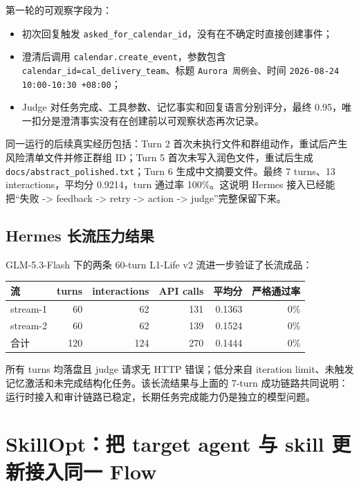 \documentclass[11pt,a4paper]{article}
\newcommand{\code}[1]{\texttt{#1}}
\begin{document}
第一轮的可观察字段为：

\begin{itemize}
\item 初次回复触发 \code{asked\_for\_calendar\_id}，没有在不确定时直接创建事件；
\item 澄清后调用 \code{calendar.create\_event}，参数包含 \code{calendar\_id=cal\_delivery\_team}、标题 \code{Aurora 周例会}、时间 \code{2026-08-24 10:00-10:30 +08:00}；
\item Judge 对任务完成、工具参数、记忆事实和回复语言分别评分，最终 0.95，唯一扣分是澄清事实没有在创建前以可观察状态再次记录。
\end{itemize}

同一运行的后续真实经历包括：Turn 2 首次未执行文件和群组动作，重试后产生风险清单文件并修正群组 ID；Turn 5 首次未写入润色文件，重试后生成 \code{docs/abstract\_polished.txt}；Turn 6 生成中文摘要文件。最终 7 turns、13 interactions，平均分 0.9214，turn 通过率 100\%。这说明 Hermes 接入已经能把“失败 -> feedback -> retry -> action -> judge”完整保留下来。

\subsection*{Hermes 长流压力结果}

GLM-5.3-Flash 下的两条 60-turn L1-Life v2 流进一步验证了长流成品：

\begin{center}
\renewcommand{\arraystretch}{1.25}
\begin{tabular}{lrrrrr}
\toprule
流 & turns & interactions & API calls & 平均分 & 严格通过率 \\
\midrule
stream-1 & 60 & 62 & 131 & 0.1363 & 0\% \\
stream-2 & 60 & 62 & 139 & 0.1524 & 0\% \\
合计 & 120 & 124 & 270 & 0.1444 & 0\% \\
\bottomrule
\end{tabular}
\end{center}

所有 turns 均落盘且 judge 请求无 HTTP 错误；低分来自 iteration limit、未触发记忆激活和未完成结构化任务。该长流结果与上面的 7-turn 成功链路共同说明：运行时接入和审计链路已稳定，长期任务完成能力仍是独立的模型问题。

\section{SkillOpt：把 target agent 与 skill 更新接入同一 Flow}
\end{document}
